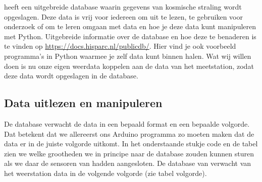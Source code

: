 \hisparc heeft een uitgebreide database waarin gegevens van kosmische straling
wordt opgeslagen. Deze data is vrij voor iedereen om uit te lezen, te
gebruiken voor onderzoek of om te leren omgaan met data en hoe je deze data
kunt manipuleren met Python. Uitgebreide informatie over de \hisparc database
en hoe deze te benaderen is te vinden op
\url{https://docs.hisparc.nl/publicdb/}. Hier vind je ook voorbeeld programma's
in Python waarmee je zelf data kunt binnen halen. Wat wij willen doen is nu
onze eigen weerdata koppelen aan de data van het \hisparc meetstation, zodat
deze data wordt opgeslagen in de \hisparc database.


\subsection{Data uitlezen en manipuleren}

De \hisparc database verwacht de data in een bepaald format en een bepaalde
volgorde. Dat betekent dat we allereerst ons Arduino programma zo moeten maken
dat de data er in de juiste volgorde uitkomt. In het onderstaande stukje code
en de tabel zien we welke grootheden we in principe naar de \hisparc database
zouden kunnen sturen als we daar de sensoren van hadden aangesloten. De
database van \hisparc verwacht van het weerstation data in de volgende
volgorde (zie tabel volgorde).

